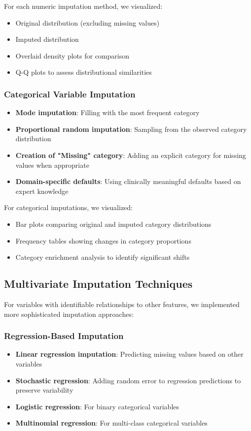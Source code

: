 For each numeric imputation method, we visualized:
\begin{itemize}
    \item Original distribution (excluding missing values)
    \item Imputed distribution
    \item Overlaid density plots for comparison
    \item Q-Q plots to assess distributional similarities
\end{itemize}

\subsubsection{Categorical Variable Imputation}
\begin{itemize}
    \item \textbf{Mode imputation}: Filling with the most frequent category
    \item \textbf{Proportional random imputation}: Sampling from the observed category distribution
    \item \textbf{Creation of "Missing" category}: Adding an explicit category for missing values when appropriate
    \item \textbf{Domain-specific defaults}: Using clinically meaningful defaults based on expert knowledge
\end{itemize}

For categorical imputations, we visualized:
\begin{itemize}
    \item Bar plots comparing original and imputed category distributions
    \item Frequency tables showing changes in category proportions
    \item Category enrichment analysis to identify significant shifts
\end{itemize}

\subsection{Multivariate Imputation Techniques}
For variables with identifiable relationships to other features, we implemented more sophisticated imputation approaches:

\subsubsection{Regression-Based Imputation}
\begin{itemize}
    \item \textbf{Linear regression imputation}: Predicting missing values based on other variables
    \item \textbf{Stochastic regression}: Adding random error to regression predictions to preserve variability
    \item \textbf{Logistic regression}: For binary categorical variables
    \item \textbf{Multinomial regression}: For multi-class categorical variables
\end{itemize}

